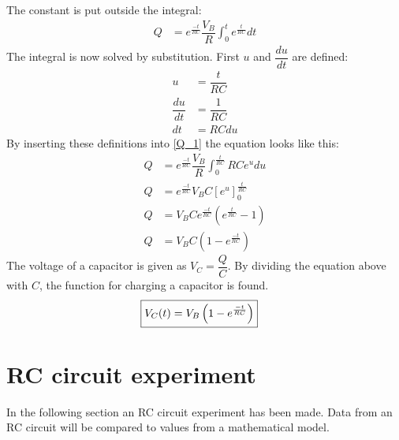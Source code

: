 The constant is put outside the integral:
\begin{align}
Q&= e^{\frac{-t}{RC}}\dfrac{V_B}{R}\int_{0}^{t}e^{\frac{t}{RC}}dt \label{Q_1}
\end{align}
The integral is now solved by substitution. First $u$ and $\dfrac{du}{dt}$ are defined:
\begin{align*}
u &= \dfrac{t}{RC}
\\
\dfrac{du}{dt}&=\dfrac{1}{RC}
\\
dt &=RC du
\end{align*} 
By inserting these definitions into \eqref{Q_1} the equation looks like this:
\begin{align*}
Q&=e^{\frac{-t}{RC}}\dfrac{V_B}{R}\int_{0}^{\frac{t}{RC}}RCe^u du
\\
Q&=e^{\frac{-t}{RC}} V_B C \left[e^u\right]_{0}^{\frac{t}{RC}}
\\
Q&=V_B C e^{\frac{-t}{RC}}\left(e^{\frac{t}{RC}}-1\right)
\\
Q&=V_B C \left(1-e^{\frac{-t}{RC}}\right)
\end{align*} 
The voltage of a capacitor is given as $V_C=\dfrac{Q}{C}$. By dividing the equation above with $C$, the function for charging a capacitor is found.
\begin{align}
\label{V_up}
\Aboxed{
V_C(t)=V_B\left(1-e^{\frac{-t}{RC}}\right)
}
\end{align}
\section{RC circuit experiment}
In the following section an RC circuit experiment has been made. Data from an RC circuit will be compared to values from a mathematical model.
